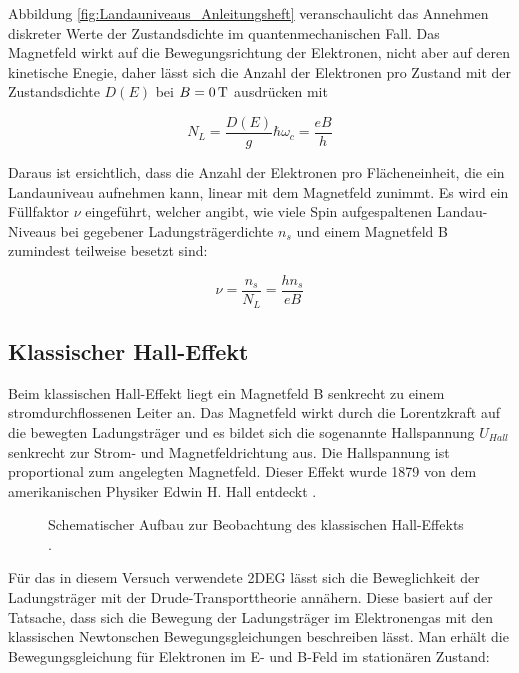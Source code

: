 Abbildung \ref{fig:Landauniveaus_Anleitungsheft} veranschaulicht das Annehmen diskreter Werte der Zustandsdichte im quantenmechanischen Fall. 
Das Magnetfeld wirkt auf die Bewegungsrichtung der Elektronen, nicht aber auf deren kinetische Enegie, daher lässt sich die Anzahl der Elektronen pro Zustand mit der Zustandsdichte $D(E)$ bei $B=\unit[0]{T}$ ausdrücken mit

\begin{equation}
N_L=\frac{D(E)}{g}\hbar\omega_c = \frac{eB}{h}
\label{eq:zustandsd_pro_landauniveau}
\end{equation}

Daraus ist ersichtlich, dass die Anzahl der Elektronen pro Flächeneinheit, die ein Landauniveau aufnehmen kann, linear mit dem Magnetfeld zunimmt. Es wird ein Füllfaktor $\nu$ eingeführt, welcher angibt, wie viele Spin aufgespaltenen Landau-Niveaus bei gegebener Ladungsträgerdichte $n_s$ und einem Magnetfeld B zumindest teilweise besetzt sind:

\begin{equation}
\nu=\frac{n_s}{N_L}=\frac{hn_s}{eB}
\label{eq:einfuehrung_fuellfakt}
\end{equation}

\newpage
\subsection{Klassischer Hall-Effekt}

Beim klassischen Hall-Effekt liegt ein Magnetfeld B senkrecht zu einem stromdurchflossenen Leiter an. Das Magnetfeld wirkt durch die Lorentzkraft auf die bewegten Ladungsträger und es bildet sich die sogenannte Hallspannung $U_{Hall}$ senkrecht zur Strom- und Magnetfeldrichtung aus. Die Hallspannung ist proportional zum angelegten Magnetfeld. Dieser Effekt wurde 1879 von dem amerikanischen Physiker Edwin H. Hall entdeckt \cite[Kap. 10.7]{tipler_modern_2008}. 

\begin{figure}[h]
	\centering
	\caption[Halleffekt klassisch]{Schematischer Aufbau zur Beobachtung des klassischen Hall-Effekts \cite{anleitung}.}
	\label{fig:U_HALL_Anleitungsheft}
\end{figure}

Für das in diesem Versuch verwendete 2DEG lässt sich die Beweglichkeit der Ladungsträger mit der Drude-Transporttheorie annähern. Diese basiert auf der Tatsache, dass sich die Bewegung der Ladungsträger im Elektronengas mit den klassischen Newtonschen Bewegungsgleichungen beschreiben lässt.
Man erhält die Bewegungsgleichung für Elektronen im E- und B-Feld im stationären Zustand:


